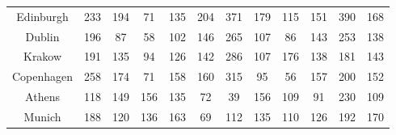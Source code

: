 \documentclass[12pt]{article}
\begin{document}
\begin{landscape}
\begin{table}[h]
\begin{tabular}{c|c|c|c|c|c|c|c|c|c|c|c}
Edinburgh & 233 & 194 & 71 & 135 & 204 & 371 & 179 & 115 & 151 & 390 & 168 \\
Dublin & 196 & 87 & 58 & 102 & 146 & 265 & 107 & 86 & 143 & 253 & 138 \\
Krakow & 191 & 135 & 94 & 126 & 142 & 286 & 107 & 176 & 138 & 181 & 143 \\
Copenhagen & 258 & 174 & 71 & 158 & 160 & 315 & 95 & 56 & 157 & 200 & 152 \\
Athens & 118 & 149 & 156 & 135 & 72 & 39 & 156 & 109 & 91 & 230 & 109 \\
Munich & 188 & 120 & 136 & 163 & 69 & 112 & 135 & 110 & 126 & 192 & 170 \\
\end{tabular}
\end{table}
\end{landscape}

\pagebreak
\end{document}
